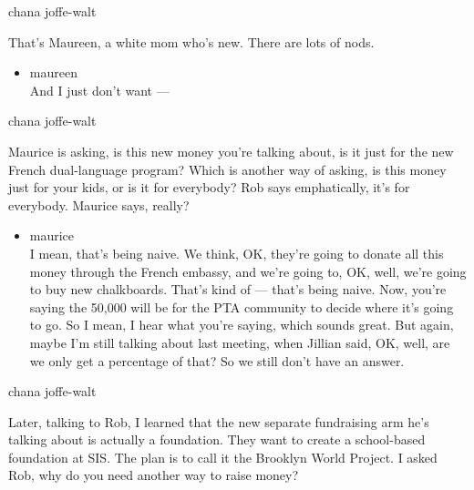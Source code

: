 chana joffe-walt

That's Maureen, a white mom who's new. There are lots of nods.

\begin{itemize}
\tightlist
\item
  maureen\\
  And I just don't want ---
\end{itemize}

chana joffe-walt

Maurice is asking, is this new money you're talking about, is it just
for the new French dual-language program? Which is another way of
asking, is this money just for your kids, or is it for everybody? Rob
says emphatically, it's for everybody. Maurice says, really?

\begin{itemize}
\tightlist
\item
  maurice\\
  I mean, that's being naive. We think, OK, they're going to donate all
  this money through the French embassy, and we're going to, OK, well,
  we're going to buy new chalkboards. That's kind of --- that's being
  naive. Now, you're saying the 50,000 will be for the PTA community to
  decide where it's going to go. So I mean, I hear what you're saying,
  which sounds great. But again, maybe I'm still talking about last
  meeting, when Jillian said, OK, well, are we only get a percentage of
  that? So we still don't have an answer.
\end{itemize}

chana joffe-walt

Later, talking to Rob, I learned that the new separate fundraising arm
he's talking about is actually a foundation. They want to create a
school-based foundation at SIS. The plan is to call it the Brooklyn
World Project. I asked Rob, why do you need another way to raise money?


